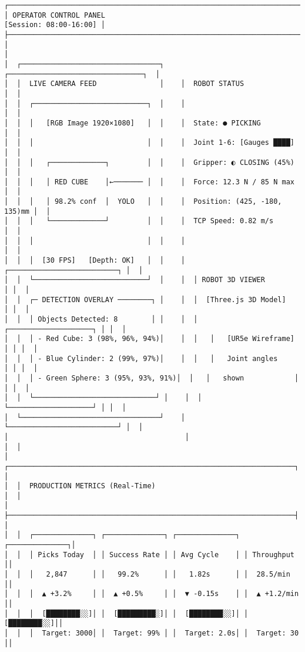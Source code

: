 \documentclass[
]{article}
\begin{document}
\begin{verbatim}
┌────────────────────────────────────────────────────────────────────────────────┐
│ OPERATOR CONTROL PANEL                                        [Session: 08:00-16:00] │
├────────────────────────────────────────────────────────────────────────────────┤
│                                                                                │
│  ┌─────────────────────────────────┐    ┌────────────────────────────────┐  │
│  │  LIVE CAMERA FEED               │    │  ROBOT STATUS                  │  │
│  │  ┌───────────────────────────┐  │    │                                │  │
│  │  │   [RGB Image 1920×1080]   │  │    │  State: ● PICKING              │  │
│  │  │                           │  │    │  Joint 1-6: [Gauges ████]      │  │
│  │  │   ┌─────────────┐         │  │    │  Gripper: ◐ CLOSING (45%)     │  │
│  │  │   │ RED CUBE    │←─────── │  │    │  Force: 12.3 N / 85 N max     │  │
│  │  │   │ 98.2% conf  │  YOLO   │  │    │  Position: (425, -180, 135)mm │  │
│  │  │   └─────────────┘         │  │    │  TCP Speed: 0.82 m/s          │  │
│  │  │                           │  │    │                                │  │
│  │  │  [30 FPS]   [Depth: OK]   │  │    │  ┌──────────────────────────┐ │  │
│  │  └───────────────────────────┘  │    │  │ ROBOT 3D VIEWER          │ │  │
│  │  ┌─ DETECTION OVERLAY ────────┐ │    │  │  [Three.js 3D Model]     │ │  │
│  │  │ Objects Detected: 8        │ │    │  │   ┌────────────────────┐ │ │  │
│  │  │ - Red Cube: 3 (98%, 96%, 94%)│    │  │   │   [UR5e Wireframe] │ │ │  │
│  │  │ - Blue Cylinder: 2 (99%, 97%)│    │  │   │   Joint angles     │ │ │  │
│  │  │ - Green Sphere: 3 (95%, 93%, 91%)│  │   │   shown            │ │ │  │
│  │  └─────────────────────────────┘ │    │  │   └────────────────────┘ │ │  │
│  └─────────────────────────────────┘    │  └──────────────────────────┘ │  │
│                                          │                                │  │
│  ┌────────────────────────────────────────────────────────────────────┐  │
│  │  PRODUCTION METRICS (Real-Time)                                    │  │
│  ├────────────────────────────────────────────────────────────────────┤  │
│  │  ┌──────────────┐ ┌──────────────┐ ┌──────────────┐ ┌──────────────┐│
│  │  │ Picks Today  │ │ Success Rate │ │ Avg Cycle    │ │ Throughput   ││
│  │  │   2,847      │ │   99.2%      │ │   1.82s      │ │  28.5/min    ││
│  │  │  ▲ +3.2%     │ │  ▲ +0.5%     │ │  ▼ -0.15s    │ │  ▲ +1.2/min  ││
│  │  │  [████████░░]│ │  [█████████░]│ │  [████████░░]│ │  [████████░░]││
│  │  │  Target: 3000│ │  Target: 99% │ │  Target: 2.0s│ │  Target: 30  ││

\end{verbatim}
\end{document}
